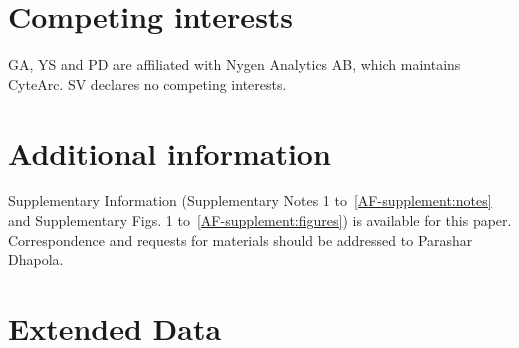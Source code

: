 \documentclass[11pt]{article}
\newcommand{\sref}[1]{\ref*{AF-#1}}
\newcommand{\wasyglyph}[1]{{\fontencoding{U}\fontfamily{wasy}\selectfont\char#1}}
\DeclareRobustCommand{\oommark}{$\times$}
\DeclareRobustCommand{\tlmark}{\raisebox{-0.2ex}{\scalebox{1.3}{\wasyglyph{28}}}}
\begin{document}
\section*{Competing interests}
GA, YS and PD are affiliated with Nygen Analytics AB, which maintains CyteArc.
SV declares no competing interests.

\section*{Additional information}
Supplementary Information (Supplementary Notes 1 to~\sref{supplement:notes} and Supplementary Figs. 1 to~\sref{supplement:figures}) is available for this paper.
Correspondence and requests for materials should be addressed to Parashar Dhapola.

\clearpage
\section*{Extended Data}
\setcounter{figure}{0}
\renewcommand{\figurename}{Extended Data Fig.}
\setcounter{table}{0}
\renewcommand{\tablename}{Extended Data Table}
\renewcommand{\theHfigure}{ED\arabic{figure}}
\renewcommand{\theHtable}{ED\arabic{table}}

\begin{table}[!ht]
  \centering
  \caption{
    \textbf{Analysis time and container memory across six 1- to 10-million-cell benchmarks.}
    Mean analysis minutes (reopening prepared input through marker testing; bold, fastest per dataset; $n = 3$ unless noted in parentheses) and allocated container GiB (grey; observed peaks in Fig.~\ref{fig:analysis_scaling}c).
    CyteArc used a 24~GiB budget in 32~GiB containers (4 to 24~GiB sweep in Fig.~\ref{fig:analysis_scaling}i); runs used 8 CPUs up to 1.3M cells and 16 CPUs above (Methods; Supplementary Note~\sref{note:Benchmark datasets and comparator runs}).
    \oommark, out of memory; \tlmark, time limit; --, not run; *, initial tier tried; \dag, UMAP initialized from scaled PCA; PFC, prefrontal cortex.
  }
  \label{edtab:toolkits}
  \footnotesize
  
\end{table}
\end{document}
